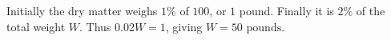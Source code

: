 Initially the dry matter weighs $1\%$ of $100$, or $1$ pound. Finally it is $2\%$ of the total weight $W$. Thus $0.02W=1$, giving $\boxed{W=50\text{ pounds}}$.
